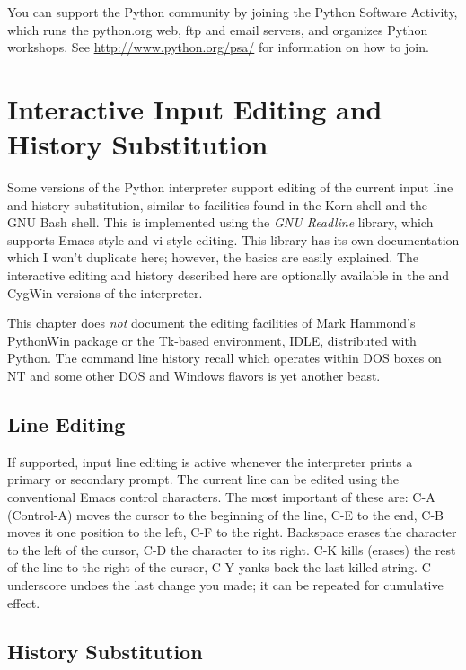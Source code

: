 \documentclass{manual}
\begin{document}
You can support the Python community by joining the Python Software
Activity, which runs the python.org web, ftp and email servers, and
organizes Python workshops.  See \url{http://www.python.org/psa/} for
information on how to join.


\appendix

\chapter{Interactive Input Editing and History Substitution
         \label{interacting}}

Some versions of the Python interpreter support editing of the current
input line and history substitution, similar to facilities found in
the Korn shell and the GNU Bash shell.  This is implemented using the
\emph{GNU Readline} library, which supports Emacs-style and vi-style
editing.  This library has its own documentation which I won't
duplicate here; however, the basics are easily explained.  The
interactive editing and history described here are optionally
available in the \UNIX{} and CygWin versions of the interpreter.

This chapter does \emph{not} document the editing facilities of Mark
Hammond's PythonWin package or the Tk-based environment, IDLE,
distributed with Python.  The command line history recall which
operates within DOS boxes on NT and some other DOS and Windows flavors 
is yet another beast.

\section{Line Editing \label{lineEditing}}

If supported, input line editing is active whenever the interpreter
prints a primary or secondary prompt.  The current line can be edited
using the conventional Emacs control characters.  The most important
of these are: C-A (Control-A) moves the cursor to the beginning of the
line, C-E to the end, C-B moves it one position to the left, C-F to
the right.  Backspace erases the character to the left of the cursor,
C-D the character to its right.  C-K kills (erases) the rest of the
line to the right of the cursor, C-Y yanks back the last killed
string.  C-underscore undoes the last change you made; it can be
repeated for cumulative effect.

\section{History Substitution \label{history}}
\end{document}
